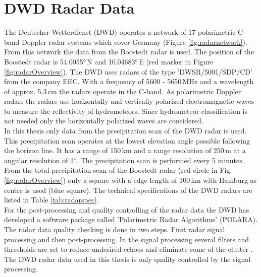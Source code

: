 \documentclass[11pt,twoside,a4paper,fleqn,x11names]{report}
\renewcommand{\deg}{\ensuremath{^{\circ}}}  %
\numberwithin{equation}{chapter}
\numberwithin{figure}{chapter}
\numberwithin{table}{chapter}
\begin{document}
\section{DWD Radar Data}
The Deutscher Wetterdienst (DWD) operates a network of 17 polarimetric C-band Doppler radar systems which cover Germany (Figure \ref{fig:radarnetwork}). From this network the data from the Boostedt radar is used. The position of the Boostedt radar is 54.0055°\,N and 10.04683°\,E (red marker in Figure \ref{fig:radarOverview}). The DWD uses radars of the type 'DWSR/5001/SDP/CD' from the company EEC. With a frequency of 5600 - 5650\,MHz and a wavelength of approx. 5.3\,cm the radars operate in the C-band. As polarimetric Doppler radars the radars use horizontally and vertically polarized electromagnetic waves to measure the  reflectivity of hydrometeors. Since hydrometeor classification is not needed only the horizontally polarized waves are considered. \\
In this thesis only data from the precipitation scan of the DWD radar is used. This precipitation scan operates at the lowest elevation angle possible following the horizon line. It has a range of 150\,km and a range resolution of 250\,m at a angular resolution of 1\deg. The precipitation scan is performed every 5 minutes. From the total precipitation scan of the Boostedt radar (red circle in Fig. \ref{fig:radarOverview}) only a square with a edge length of 100\,km with Hamburg as centre is used (blue square). The technical specifications of the DWD radars are listed in Table \ref{tab:radarspec}.\\
For the post-processing and quality controlling of the radar data the DWD has developed a software package called 'Polarimetric Radar Algorithms' (POLARA). The radar data quality checking is done in two steps. First radar signal processing and then post-processing. In the signal processing several filters and thresholds are set to reduce undesired echoes and eliminate some  of the clutter \citep{Werner2014}. The DWD radar data used in this thesis is only quality controlled by the signal processing.
\end{document}

